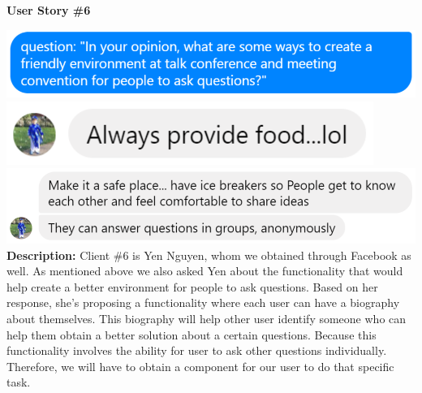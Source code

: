 \documentclass[12pt]{article}
\begin{document}
\textbf{User Story \#6}
\begin{flushleft}
\includegraphics[width=\textwidth]{Assignment5_userstory_6a.eps}
\includegraphics[width=\textwidth]{Assignment5_userstory_6b.eps}
\includegraphics[width=\textwidth]{Assignment5_userstory_6c.eps}
\textbf{Description:} Client \#6 is Yen Nguyen, whom we obtained through Facebook as well. As mentioned above we also asked Yen about the functionality that would help create a better environment for people to ask questions. Based on her response, she's proposing a functionality where each user can have a biography about themselves. This biography will help other user identify someone who can help them obtain a better solution about a certain questions. Because this functionality involves the ability for user to ask other questions individually. Therefore, we will have to obtain a component for our user to do that specific task.\vspace{2cm}
\end{flushleft}
\end{document}
